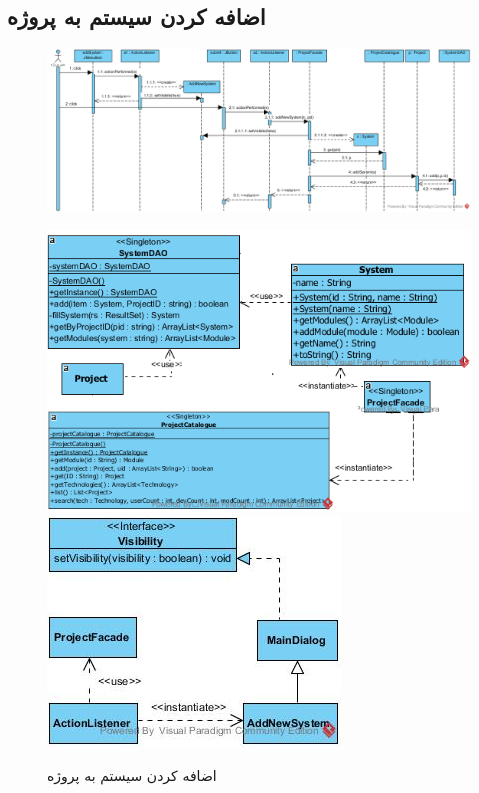 \begin{landscape}
\section{اضافه کردن سیستم به پروژه}
\begin{figure}[H]
	\centering
	\includegraphics[scale=0.6]{img/sequence-design/AddSystemToProject}
\end{figure}
\begin{figure}[H]
	\centering
	\includegraphics[scale=0.7]{img/sequence-design/AddSystemToProjectC}
	\includegraphics[scale=0.7]{img/sequence-design/AddSystemToProjectUI}
	\caption{اضافه کردن سیستم به پروژه}
\end{figure}



\end{landscape}
